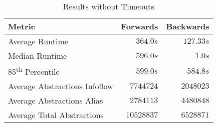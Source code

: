\documentclass[../draft.tex]{subfiles}
\begin{document}
    \begin{table}[ht]
        \centering
        \begin{tabular}{l | r | r}
            \textbf{Metric} & \textbf{Forwards} & \textbf{Backwards}\\
            \hline\hline
            Average Runtime & $364.0s$ & $127.33s$\\
            Median Runtime & $596.0s$ & $1.0s$\\
            85\textsuperscript{th} Percentile & $599.0s$ & $584.8s$\\
            \hline
            Average Abstractions Infoflow & $7744724$ & $2048023$\\
            Average Abstractions Alias & $2784113$ & $4480848$\\
            Average Total Abstractions & $10528837$ & $6528871$\\            
        \end{tabular}
        \caption{Results without Timeouts}
        \label{t:realworldresultswithouttimeout}
    \end{table}
\end{document}
